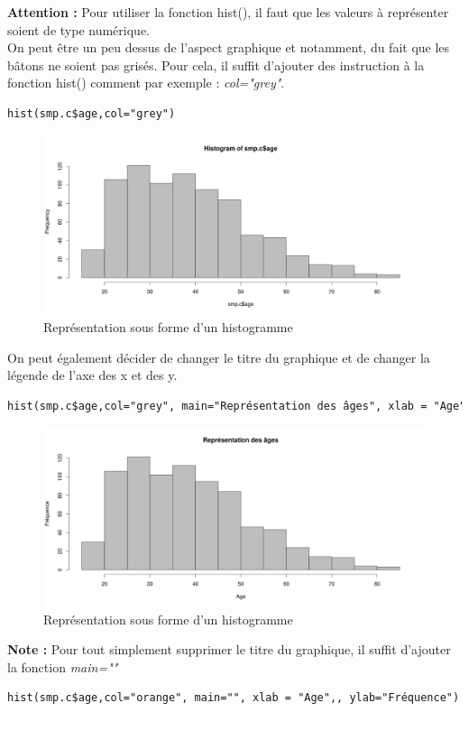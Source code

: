 \textbf{Attention : } Pour utiliser la fonction hist(), il faut que les valeurs à représenter soient de type numérique.\newline
\\
On peut être un peu dessus de l'aspect graphique et notamment, du fait que les bâtons ne soient pas grisés. Pour cela, il suffit d'ajouter des instruction à la fonction hist() comment par exemple : \textit{col="grey"}.
\begin{lstlisting}[language=html]
hist(smp.c$age,col="grey")
\end{lstlisting}
\begin{figure}[H]\begin{center}\includegraphics[scale=0.4]{ilu/tp3a.png}\caption{Représentation sous forme d'un histogramme}\end{center}\end{figure}
On peut également décider de changer le titre du graphique et de changer la légende de l'axe des x et des y. 
\begin{lstlisting}[language=html]
hist(smp.c$age,col="grey", main="Représentation des âges", xlab = "Age",, ylab="Fréquence")
\end{lstlisting}
\begin{figure}[H]\begin{center}\includegraphics[scale=0.4]{ilu/tp3b.png}\caption{Représentation sous forme d'un histogramme}\end{center}\end{figure}
\textbf{Note : } Pour tout simplement supprimer le titre du graphique, il suffit d'ajouter la fonction \textit{main=""}
\begin{lstlisting}[language=html]
hist(smp.c$age,col="orange", main="", xlab = "Age",, ylab="Fréquence")
\end{lstlisting}
\textcolor{white}{.}\newline
